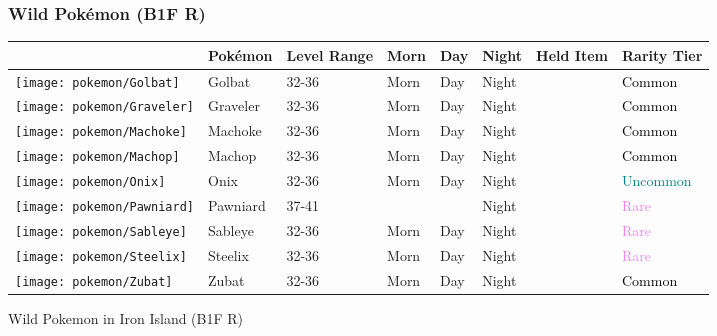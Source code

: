 \subsubsection{Wild Pokémon (B1F R)}%
\label{ssubsec:WildPokmon(B1FR)}%
\begin{longtable}{||l l l l l l l l||}%
\hline%
&Pokémon&Level Range&Morn&Day&Night&Held Item&Rarity Tier\\%
\hline%
\endhead%
\hline%
\texttt{[image: pokemon/Golbat]}&Golbat&32{-}36&Morn&Day&Night&&\textcolor{black}{%
Common%
}\\%
\hline%
\texttt{[image: pokemon/Graveler]}&Graveler&32{-}36&Morn&Day&Night&&\textcolor{black}{%
Common%
}\\%
\hline%
\texttt{[image: pokemon/Machoke]}&Machoke&32{-}36&Morn&Day&Night&&\textcolor{black}{%
Common%
}\\%
\hline%
\texttt{[image: pokemon/Machop]}&Machop&32{-}36&Morn&Day&Night&&\textcolor{black}{%
Common%
}\\%
\hline%
\texttt{[image: pokemon/Onix]}&Onix&32{-}36&Morn&Day&Night&&\textcolor{teal}{%
Uncommon%
}\\%
\hline%
\texttt{[image: pokemon/Pawniard]}&Pawniard&37{-}41&&&Night&&\textcolor{violet}{%
Rare%
}\\%
\hline%
\texttt{[image: pokemon/Sableye]}&Sableye&32{-}36&Morn&Day&Night&&\textcolor{violet}{%
Rare%
}\\%
\hline%
\texttt{[image: pokemon/Steelix]}&Steelix&32{-}36&Morn&Day&Night&&\textcolor{violet}{%
Rare%
}\\%
\hline%
\texttt{[image: pokemon/Zubat]}&Zubat&32{-}36&Morn&Day&Night&&\textcolor{black}{%
Common%
}\\%
\hline%
\end{longtable}%
\caption{Wild Pokemon in Iron Island (B1F R)}